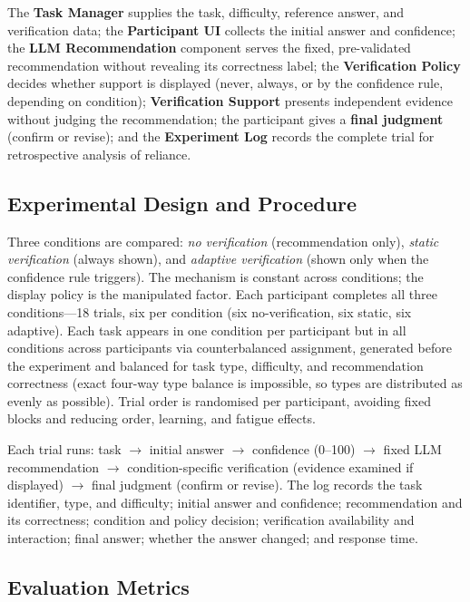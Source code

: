 \documentclass[oneside,final,14pt,a4paper]{extreport}
\begin{document}
The \textbf{Task Manager} supplies the task, difficulty, reference answer, and
verification data; the \textbf{Participant UI} collects the initial answer and
confidence; the \textbf{LLM Recommendation} component serves the fixed,
pre-validated recommendation without revealing its correctness label; the
\textbf{Verification Policy} decides whether support is displayed (never,
always, or by the confidence rule, depending on condition); \textbf{Verification
Support} presents independent evidence without judging the recommendation; the
participant gives a \textbf{final judgment} (confirm or revise); and the
\textbf{Experiment Log} records the complete trial for retrospective analysis
of reliance.

\subsection{Experimental Design and Procedure}

Three conditions are compared: \emph{no verification} (recommendation only),
\emph{static verification} (always shown), and \emph{adaptive verification}
(shown only when the confidence rule triggers). The mechanism is constant
across conditions; the display policy is the manipulated factor. Each
participant completes all three conditions---18 trials, six per condition
(six no-verification, six static, six adaptive). Each task appears in one
condition per participant but in all conditions across participants via
counterbalanced assignment, generated before the experiment and balanced for
task type, difficulty, and recommendation correctness (exact four-way type
balance is impossible, so types are distributed as evenly as possible). Trial
order is randomised per participant, avoiding fixed blocks and reducing order,
learning, and fatigue effects.

Each trial runs: task $\to$ initial answer $\to$ confidence (0--100) $\to$ fixed LLM recommendation $\to$ condition-specific verification (evidence
examined if displayed) $\to$ final judgment (confirm or revise). The log
records the task identifier, type, and difficulty; initial answer and
confidence; recommendation and its correctness; condition and policy decision;
verification availability and interaction; final answer; whether the answer
changed; and response time.

\subsection{Evaluation Metrics}
\end{document}
